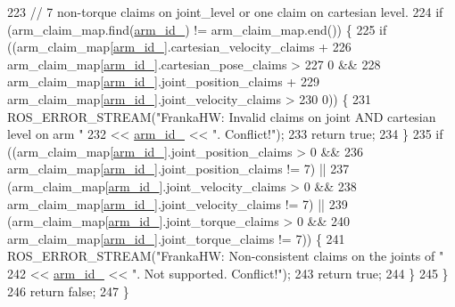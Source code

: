 \begin{DoxyCode}
223   \textcolor{comment}{// 7 non-torque claims on joint\_level or one claim on cartesian level.}
224   \textcolor{keywordflow}{if} (arm\_claim\_map.find(\hyperlink{classfranka__hw_1_1FrankaHW_acb16f326973e2eb1c33c28f71492d7d5}{arm\_id\_}) != arm\_claim\_map.end()) \{
225     \textcolor{keywordflow}{if} ((arm\_claim\_map[\hyperlink{classfranka__hw_1_1FrankaHW_acb16f326973e2eb1c33c28f71492d7d5}{arm\_id\_}].cartesian\_velocity\_claims +
226                  arm\_claim\_map[\hyperlink{classfranka__hw_1_1FrankaHW_acb16f326973e2eb1c33c28f71492d7d5}{arm\_id\_}].cartesian\_pose\_claims >
227              0 &&
228          arm\_claim\_map[\hyperlink{classfranka__hw_1_1FrankaHW_acb16f326973e2eb1c33c28f71492d7d5}{arm\_id\_}].joint\_position\_claims +
229                  arm\_claim\_map[\hyperlink{classfranka__hw_1_1FrankaHW_acb16f326973e2eb1c33c28f71492d7d5}{arm\_id\_}].joint\_velocity\_claims >
230              0)) \{
231       ROS\_ERROR\_STREAM(\textcolor{stringliteral}{"FrankaHW: Invalid claims on joint AND cartesian level on arm "}
232                        << \hyperlink{classfranka__hw_1_1FrankaHW_acb16f326973e2eb1c33c28f71492d7d5}{arm\_id\_} << \textcolor{stringliteral}{". Conflict!"});
233       \textcolor{keywordflow}{return} \textcolor{keyword}{true};
234     \}
235     \textcolor{keywordflow}{if} ((arm\_claim\_map[\hyperlink{classfranka__hw_1_1FrankaHW_acb16f326973e2eb1c33c28f71492d7d5}{arm\_id\_}].joint\_position\_claims > 0 &&
236          arm\_claim\_map[\hyperlink{classfranka__hw_1_1FrankaHW_acb16f326973e2eb1c33c28f71492d7d5}{arm\_id\_}].joint\_position\_claims != 7) ||
237         (arm\_claim\_map[\hyperlink{classfranka__hw_1_1FrankaHW_acb16f326973e2eb1c33c28f71492d7d5}{arm\_id\_}].joint\_velocity\_claims > 0 &&
238          arm\_claim\_map[\hyperlink{classfranka__hw_1_1FrankaHW_acb16f326973e2eb1c33c28f71492d7d5}{arm\_id\_}].joint\_velocity\_claims != 7) ||
239         (arm\_claim\_map[\hyperlink{classfranka__hw_1_1FrankaHW_acb16f326973e2eb1c33c28f71492d7d5}{arm\_id\_}].joint\_torque\_claims > 0 &&
240          arm\_claim\_map[\hyperlink{classfranka__hw_1_1FrankaHW_acb16f326973e2eb1c33c28f71492d7d5}{arm\_id\_}].joint\_torque\_claims != 7)) \{
241       ROS\_ERROR\_STREAM(\textcolor{stringliteral}{"FrankaHW: Non-consistent claims on the joints of "}
242                        << \hyperlink{classfranka__hw_1_1FrankaHW_acb16f326973e2eb1c33c28f71492d7d5}{arm\_id\_} << \textcolor{stringliteral}{". Not supported. Conflict!"});
243       \textcolor{keywordflow}{return} \textcolor{keyword}{true};
244     \}
245   \}
246   \textcolor{keywordflow}{return} \textcolor{keyword}{false};
247 \}
\end{DoxyCode}
